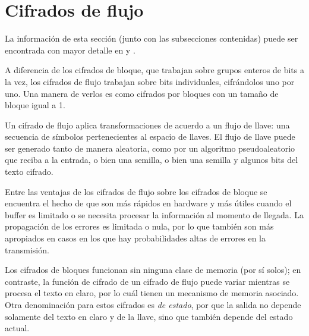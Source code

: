%
%

\section{Cifrados de flujo}
\label{sec:flujo}

La información de esta sección (junto con las subsecciones contenidas) puede
ser encontrada con mayor detalle en \cite{menezes, stallings} y
\cite{alan_konheim}.

A diferencia de los cifrados de bloque, que trabajan sobre grupos enteros de
bits a la vez, los cifrados de flujo trabajan sobre bits individuales,
cifrándolos uno por uno. Una manera de verlos es como cifrados por bloques con
un tamaño de bloque igual a 1.

Un cifrado de flujo aplica transformaciones de acuerdo a un flujo de llave:
una secuencia de símbolos pertenecientes al espacio de llaves. El flujo de
llave puede ser generado tanto de manera aleatoria, como por un algoritmo
pseudoaleatorio que reciba a la entrada, o bien una semilla, o bien una
semilla y algunos bits del texto cifrado.

Entre las ventajas de los cifrados de flujo sobre los cifrados de bloque se
encuentra el hecho de que son más rápidos en hardware y más útiles cuando
el buffer es limitado o se necesita procesar la información al momento de
llegada. La propagación de los errores es limitada o nula, por lo que también
son más apropiados en casos en los que hay probabilidades altas de errores en
la transmisión.

Los cifrados de bloques funcionan sin ninguna clase de memoria (por sí solos);
en contraste, la función de cifrado de un cifrado de flujo puede variar
mientras se procesa el texto en claro, por lo cuál tienen un mecanismo de
memoria asociado. Otra denominación para estos cifrados es \textit{de estado},
por que la salida no depende solamente del texto en claro y de la llave, sino
que también depende del estado actual.




